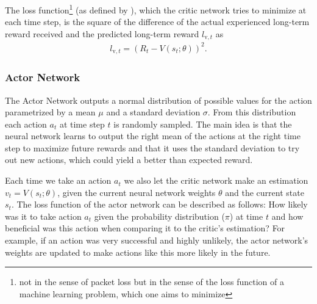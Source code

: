 \documentclass[newfonts=false,format=sigconf,10pt,letterpaper]{acmart}
\newcommand\note[2]{{\color{#1}#2}}
\newcommand\todo[1]{{\note{red}{TODO: #1}}}
\begin{document}


The loss function\footnote{not in the sense of packet loss but in the sense of the loss function of a machine learning problem, which one aims to minimize} (as defined by \cite{mnih_asynchronous_2016}), which the critic network tries to minimize at each time step, is the square of the difference of the actual experienced long-term reward received and the predicted long-term reward $l_{\text{v},t}$ as
\begin{align}
l_{\text{v},t} = \left(R_t - V(s_t; \theta)\right)^2.
\end{align}

\subsubsection{Actor Network}
\label{subsubsec:genericactor}

The Actor Network outputs a normal distribution of possible values for the action parametrized by a mean $\mu$ and a standard deviation $\sigma$. From this distribution each action $a_t$ at time step $t$ is randomly sampled. The main idea is that the neural network learns to output the right mean of the actions at the right time step to maximize future rewards and that it uses the standard deviation to try out new actions, which could yield a better than expected reward. 

Each time we take an action $a_t$ we also let the critic network make an estimation $v_t = V(s_t; \theta)$, given the current neural network weights $\theta$ and the current state $s_t$. The loss function of the actor network can be described as follows: How likely was it to take action $a_t$ given the probability distribution ($\pi$) at time $t$ and how beneficial was this action when comparing it to the critic's estimation? For example, if an action was very successful and highly unlikely, the actor network's weights are updated to make actions like this more likely in the future. 
\end{document}
